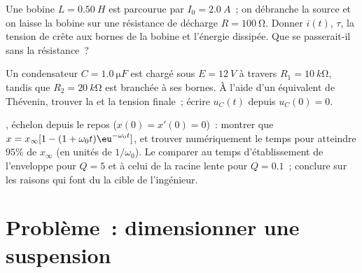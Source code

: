 \begin{exercise}[$\star\star\star$]\label{exo:b1:transient-regimes:10}
Une bobine $L = \qty{0.50}{H}$ est parcourue par $I_0 = \qty{2.0}{A}$~;
on débranche la source et on laisse la bobine sur une résistance de
décharge $R = \qty{100}{\ohm}$. Donner $i(t)$, $\tau$, la tension de
crête aux bornes de la bobine et l'énergie dissipée. Que se
passerait-il sans la résistance~?
\end{exercise}

\begin{exercise}[$\star\star\star$]\label{exo:b1:transient-regimes:11}
Un condensateur $C = \qty{1.0}{\micro F}$ est chargé sous $E = \qty{12}{V}$
à travers $R_1 = \qty{10}{k\ohm}$, tandis que $R_2 = \qty{20}{k\ohm}$ est
branchée à ses bornes. À l'aide d'un équivalent de Thévenin, trouver la
 et la tension finale~; écrire $u_C(t)$ depuis $u_C(0) = 0$.
\end{exercise}

\begin{exercise}[$\star\star\star$]\label{exo:b1:transient-regimes:12}
, échelon depuis le repos ($x(0) = x'(0) = 0$)~: montrer
que $x = x_\infty[1 - (1 + \omega_0 t)\eu^{-\omega_0 t}]$, et trouver
numériquement le temps pour atteindre $95\%$ de $x_\infty$ (en unités de
$1/\omega_0$). Le comparer au temps d'établissement de l'enveloppe pour
$Q = 5$ et à celui de la racine lente pour $Q = 0.1$~; conclure sur les
raisons qui font du  la cible de l'ingénieur.
\end{exercise}

\section{Problème~: dimensionner une suspension}

